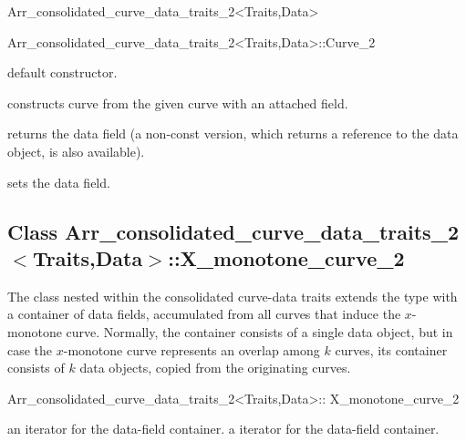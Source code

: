 \begin{ccRefClass}{Arr_consolidated_curve_data_traits_2<Traits,Data>}
\begin{ccClass}{Arr_consolidated_curve_data_traits_2<Traits,Data>::Curve_2}

\ccInheritsFrom

\ccCreation
{}

    {default constructor.}

    {constructs curve from the given  curve with an attached
      field.}

\ccAccessFunctions

  {returns the data field (a non-const version, which returns a reference
   to the data object, is also available).}

  {sets the data field.}

\end{ccClass}

\subsection*{Class Arr\_consolidated\_curve\_data\_traits\_2$<$Traits,Data$>$::X\_monotone\_curve\_2}

The  class nested within the consolidated 
curve-data traits extends the  type with 
a container of data fields, accumulated from all curves that induce the
$x$-monotone curve. Normally, the container consists of a single data object,
but in case the $x$-monotone curve represents an overlap among $k$ curves,
its container consists of $k$ data objects, copied from the originating curves.

\begin{ccClass}{Arr_consolidated_curve_data_traits_2<Traits,Data>::
                X_monotone_curve_2}

\ccInheritsFrom

\ccTypes

    {an iterator for the data-field container.}
\ccGlue
{}
    {a  iterator for the data-field container.}

\ccCreation
{}


\end{ccClass}
\end{ccRefClass}
